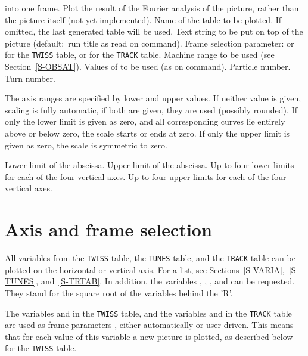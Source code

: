 \begin{mylist}
into one frame.
Plot the result of the Fourier analysis of the picture, rather than
the picture itself (not yet implemented).
Name of the table to be plotted.
If omitted, the last generated table will be used.
Text string to be put on top of the picture
(default:~run title as read on  command).
Frame selection parameter:  or  for the
{\tt TWISS} table,
 or  for the {\tt TRACK} table.
Machine range to be used (see Section~\ref{S-OBSAT}).
Values of  to be used (as on  command).
Particle number.
Turn number.
\end{mylist}
The axis ranges are specified by lower and upper values.
If neither value is given, scaling is fully automatic,
if both are given, they are used (possibly rounded).
If only the lower limit is given as zero,
and all corresponding curves lie entirely above or below zero,
the scale starts or ends at zero.
If only the upper limit is given as zero, the scale is symmetric to zero.
\begin{mylist}
Lower limit of the abscissa.
Upper limit of the abscissa.
Up to four lower limits for each of the four vertical axes.
Up to four upper limits for each of the four vertical axes.
\end{mylist}
 
\section{Axis and frame selection}
All variables from the {\tt TWISS} table, the {\tt TUNES} table,
and the {\tt TRACK} table can be plotted on the horizontal or vertical axis.
For a list, see Sections~\ref{S-VARIA},~\ref{S-TUNES},
and~\ref{S-TRTAB}.
In addition, the variables , , ,
and  can be requested. They stand for the square root
of the variables behind the 'R'.
 
The variables  and   in the {\tt TWISS} table, and
the variables  and  in the {\tt TRACK} table
are used as frame parameters , either automatically or
user-driven. This means that for each value of this  variable  a new
picture  is plotted, as described below for the {\tt TWISS} table.

